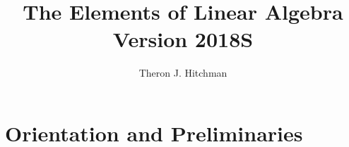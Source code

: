 \documentclass[11pt]{book}
\title{The Elements of Linear Algebra\\ Version 2018S}
\author{Theron J. Hitchman}
\theoremstyle{plain}
\theoremstyle{definition}
\begin{document}
\maketitle


\chapter{Orientation and Preliminaries}














\end{document}
